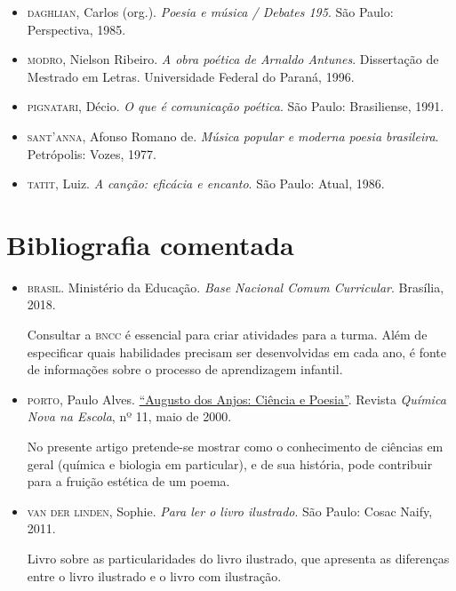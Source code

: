 \documentclass[11pt]{extarticle}
\begin{document}
\begin{itemize}
\item \textsc{daghlian}, Carlos (org.). \textit{Poesia e música / Debates 195}. São Paulo: Perspectiva, 1985.

\item \textsc{modro}, Nielson Ribeiro. \textit{A obra poética de Arnaldo Antunes}. Dissertação de Mestrado em Letras. 
Universidade Federal do Paraná, 1996.

\item \textsc{pignatari}, Décio. \textit{O que é comunicação poética}. São Paulo: Brasiliense, 1991.

\item \textsc{sant'anna}, Afonso Romano de. \textit{Música popular e moderna poesia brasileira}. Petrópolis: Vozes, 1977.

\item \textsc{tatit}, Luiz. \textit{A canção: eficácia e encanto}. São Paulo: Atual, 1986.
\end{itemize}

\section{Bibliografia comentada}

\begin{itemize}
\item \textsc{brasil}. Ministério da Educação. \textit{Base Nacional Comum Curricular}. Brasília, 2018.

Consultar a \textsc{bncc} é essencial para criar atividades para a turma. Além de especificar 
quais habilidades precisam ser desenvolvidas em cada ano, é fonte de informações sobre 
o processo de aprendizagem infantil. 

 \item \textsc{porto}, Paulo Alves. \href{http://qnesc.sbq.org.br/online/qnesc11/v11a07.pdf}{``Augusto dos 
 	Anjos: Ciência e Poesia''}. Revista \textit{Química Nova na Escola},
	nº 11, maio de 2000.  

No presente artigo pretende-se mostrar como o conhecimento de ciências em geral (química e biologia em
particular), e de sua história, pode contribuir para a fruição estética de um poema.


\item \textsc{van der linden}, Sophie. \textit{Para ler o livro ilustrado}. São Paulo: Cosac Naify, 2011.

Livro sobre as particularidades do livro ilustrado, que apresenta as diferenças entre o livro ilustrado e o livro com ilustração. 
\end{itemize}
\end{document}
